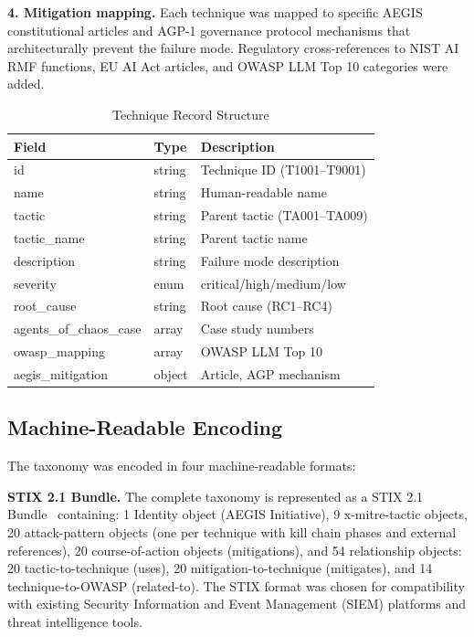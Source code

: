\documentclass{IEEEoj-data}
\begin{document}
{\bf 4. Mitigation mapping.} Each technique was mapped to specific AEGIS constitutional articles and AGP-1 governance protocol mechanisms that architecturally prevent the failure mode. Regulatory cross-references to NIST AI RMF functions, EU AI Act articles, and OWASP LLM Top 10 categories were added.

\begin{table}[!b]
\caption{Technique Record Structure}
\label{tab:record}
\centering
\small
\begin{tabular}{|p{2.4cm}|l|p{3cm}|}
\hline
{\bf Field} & {\bf Type} & {\bf Description} \\
\hline
id & string & Technique ID (T1001--T9001) \\
name & string & Human-readable name \\
tactic & string & Parent tactic (TA001--TA009) \\
tactic\_name & string & Parent tactic name \\
description & string & Failure mode description \\
severity & enum & critical/high/medium/low \\
root\_cause & string & Root cause (RC1--RC4) \\
agents\_of\_chaos\_case & array & Case study numbers~\cite{ref4} \\
owasp\_mapping & array & OWASP LLM Top 10 \\
aegis\_mitigation & object & Article, AGP mechanism \\
\hline
\end{tabular}
\normalsize
\end{table}

\subsection*{Machine-Readable Encoding}

The taxonomy was encoded in four machine-readable formats:

{\bf STIX 2.1 Bundle.} The complete taxonomy is represented as a STIX 2.1 Bundle~\cite{ref7} containing: 1 Identity object (AEGIS Initiative), 9 x-mitre-tactic objects, 20 attack-pattern objects (one per technique with kill chain phases and external references), 20 course-of-action objects (mitigations), and 54 relationship objects: 20 tactic-to-technique (uses), 20 mitigation-to-technique (mitigates), and 14 technique-to-OWASP (related-to). The STIX format was chosen for compatibility with existing Security Information and Event Management (SIEM) platforms and threat intelligence tools.
\end{document}
